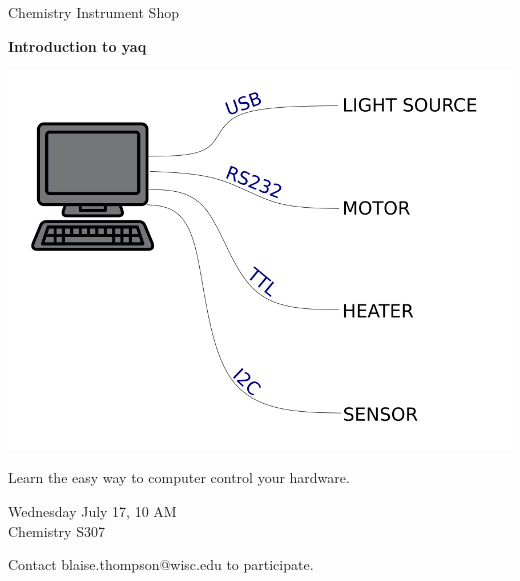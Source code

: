 \documentclass{article}
\begin{document}
\center

\Huge

Chemistry Instrument Shop

\textbf{
Introduction to yaq
}

\includegraphics[width=\linewidth]{coverart.png}

{
\huge
Learn the easy way to computer control your hardware.
}

\vfill

{
\huge
Wednesday July 17, 10 AM \\
Chemistry S307
}

\vfill

{
\huge
Contact blaise.thompson@wisc.edu to participate.
}
\end{document}
